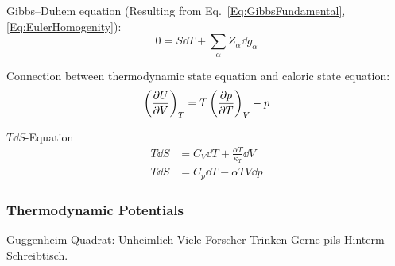 			\noindent
			Gibbs--Duhem equation (Resulting from Eq.~\ref{Eq:GibbsFundamental}, \ref{Eq:EulerHomogenity}):
			\begin{equation}
				0 = S \dd T + \sum_\alpha Z_\alpha \dd g_\alpha
			\end{equation}

			\noindent
			Connection between thermodynamic state equation and caloric state equation:
			\begin{equation}
				\left(\pdv{U}{V}\right)_T = T\left(\pdv{p}{T}\right)_V - p
			\end{equation}

			\noindent
			$T \dd S$-Equation
			\begin{equation}
				\begin{aligned}
					T \dd S &= C_V \dd T + \frac{\alpha T}{\kappa_T} \dd V \\
					T \dd S &= C_p \dd T - \alpha T V \dd p
				\end{aligned}
			\end{equation}


		\subsubsection{Thermodynamic Potentials}
			\noindent
			Guggenheim Quadrat:
			Unheimlich Viele Forscher Trinken Gerne pils Hinterm Schreibtisch. %

